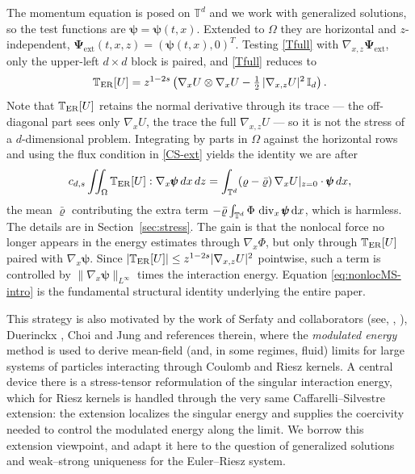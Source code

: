 \documentclass[12pt,a4paper,twoside]{article}
\newcommand{\Div}{\operatorname{div}}
\newcommand{\vr}{\varrho}
\newcommand{\Grad}{\nabla}
\newcommand{\dx}{{\,\rm d} {x}}
\numberwithin{equation}{section}%
\begin{document}
	The momentum equation is posed on $\mathbb T^d$ and we work with generalized solutions, so the test functions are $\pmb\psi=\pmb\psi(t,x)$. Extended to $\Omega$ they are horizontal and
	$z$-independent, $\pmb\Psi_{\mathrm{ext}}(t,x,z)=(\pmb\psi(t,x),0)^T$. Testing \eqref{Tfull} with $\Grad_{x,z}\pmb\Psi_{\mathrm{ext}}$, only the upper-left $d\times d$
	block is paired, and \eqref{Tfull} reduces to
	\begin{equation}\label{T}
		\mathbb{T}_{\rm ER}[U] = z^{1-2s}\left( \Grad_x U \otimes \Grad_x U - \tfrac12\,|\Grad_{x,z} U|^2\,\mathbb{I}_d \right).
	\end{equation}
	Note that $\mathbb{T}_{\rm ER}[U]$ retains the normal derivative through its trace --- the
	off-diagonal part sees only $\Grad_x U$, the trace the full $\Grad_{x,z}U$ --- so it is not
	the stress of a $d$-dimensional problem. Integrating by parts in $\Omega$ against the
	horizontal rows and using the flux condition in \eqref{CS-ext} yields the identity we are
	after
	\begin{equation}\label{eq:nonlocMS-intro}
		c_{d,s} \iint_{\Omega} \mathbb{T}_{\rm ER}[U] : \Grad_x \pmb{\psi} \,dx\,dz
		= \int_{\mathbb{T}^d} (\vr-\bar\vr)\,\Grad_x U|_{z=0} \cdot \pmb{\psi} \,dx ,
	\end{equation}
	the mean $\bar\vr$ contributing the extra term $ -\bar\vr\int_{\mathbb T^d}\Phi\,\Div_x\pmb\psi \dx $, which is harmless. The details are in Section~\ref{sec:stress}. The gain is that the nonlocal force no longer appears in the energy estimates through $\Grad_x\Phi$, but only through $\mathbb T_{\rm ER}[U]$ paired with $\Grad_x\pmb\psi$. Since $|\mathbb T_{\rm ER}[U]|\le z^{1-2s}|\Grad_{x,z}U|^2$ pointwise, such a term is controlled by $\|\Grad_x\pmb\psi\|_{L^\infty}$ times the interaction energy. Equation \eqref{eq:nonlocMS-intro} is the fundamental structural identity underlying the entire paper.
	
	
	\medskip
	This strategy is also motivated by the work of Serfaty and collaborators (see, \cite{Serfaty2020}, \cite{NRS2022}), Duerinckx \cite{Du2016}, Choi and Jung \cite{CJ2024b} and references therein, where the \emph{modulated energy} method is used to derive mean-field (and, in some regimes, fluid) limits for large systems of particles interacting through Coulomb and Riesz kernels. A central device there is a stress-tensor reformulation of the singular interaction energy, which for Riesz kernels is handled through the very same Caffarelli--Silvestre extension: the extension localizes the singular energy and supplies the coercivity needed to control the modulated energy along the limit. We borrow this extension viewpoint, and adapt it here to the question of generalized solutions and weak--strong uniqueness for the Euler--Riesz system.\par 
	\medskip
\end{document}
